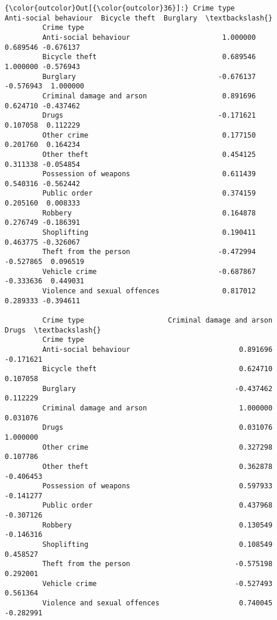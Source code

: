 \documentclass[11pt]{article}
\begin{document}
\begin{Verbatim}[commandchars=\\\{\}]
{\color{outcolor}Out[{\color{outcolor}36}]:} Crime type                    Anti-social behaviour  Bicycle theft  Burglary  \textbackslash{}
         Crime type                                                                     
         Anti-social behaviour                      1.000000       0.689546 -0.676137   
         Bicycle theft                              0.689546       1.000000 -0.576943   
         Burglary                                  -0.676137      -0.576943  1.000000   
         Criminal damage and arson                  0.891696       0.624710 -0.437462   
         Drugs                                     -0.171621       0.107058  0.112229   
         Other crime                                0.177150       0.201760  0.164234   
         Other theft                                0.454125       0.311338 -0.054854   
         Possession of weapons                      0.611439       0.540316 -0.562442   
         Public order                               0.374159       0.205160  0.008333   
         Robbery                                    0.164878       0.276749 -0.186391   
         Shoplifting                                0.190411       0.463775 -0.326067   
         Theft from the person                     -0.472994      -0.527865  0.096519   
         Vehicle crime                             -0.687867      -0.333636  0.449031   
         Violence and sexual offences               0.817012       0.289333 -0.394611   
         
         Crime type                    Criminal damage and arson     Drugs  \textbackslash{}
         Crime type                                                          
         Anti-social behaviour                          0.891696 -0.171621   
         Bicycle theft                                  0.624710  0.107058   
         Burglary                                      -0.437462  0.112229   
         Criminal damage and arson                      1.000000  0.031076   
         Drugs                                          0.031076  1.000000   
         Other crime                                    0.327298  0.107786   
         Other theft                                    0.362878 -0.406453   
         Possession of weapons                          0.597933 -0.141277   
         Public order                                   0.437968 -0.307126   
         Robbery                                        0.130549 -0.146316   
         Shoplifting                                    0.108549  0.458527   
         Theft from the person                         -0.575198  0.292001   
         Vehicle crime                                 -0.527493  0.561364   
         Violence and sexual offences                   0.740045 -0.282991   
         

\end{Verbatim}
\end{document}
